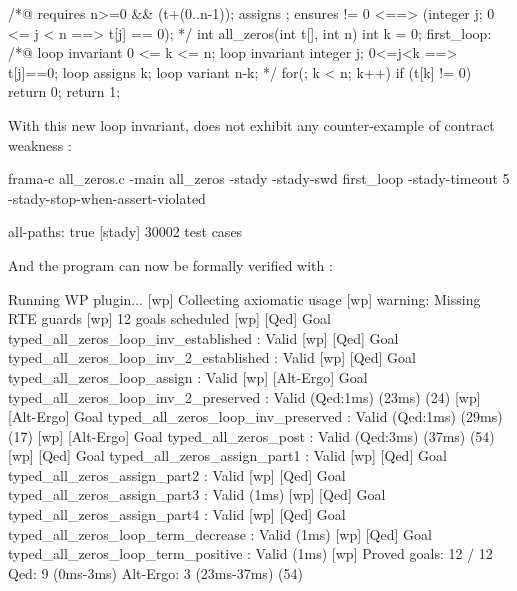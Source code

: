 \documentclass[web]{frama-c-book}
\begin{document}
\begin{ccode}
/*@ requires n>=0 && \valid(t+(0..n-1));
    assigns \nothing;
    ensures \result != 0 <==> 
      (\forall integer j; 0 <= j < n ==> t[j] == 0);
*/
int all_zeros(int t[], int n) {
  int k = 0;
 first_loop:
  /*@ loop invariant 0 <= k <= n;
      loop invariant \forall integer j; 0<=j<k ==> t[j]==0;
      loop assigns k;
      loop variant n-k; 
  */
  for(; k < n; k++) 
    if (t[k] != 0) 
      return 0;
  return 1;
}
\end{ccode}

With this new loop invariant, \stady does not exhibit any counter-example of contract weakness :

\begin{shell}
  frama-c all_zeros.c -main all_zeros -stady -stady-swd first_loop -stady-timeout 5
  -stady-stop-when-assert-violated
\end{shell}

\begin{shell}
[stady] all-paths: true
[stady] 30002 test cases
\end{shell}

And the program can now be formally verified with  :

\begin{shell}
[wp] Running WP plugin...
[wp] Collecting axiomatic usage
[wp] warning: Missing RTE guards
[wp] 12 goals scheduled
[wp] [Qed] Goal typed_all_zeros_loop_inv_established : Valid
[wp] [Qed] Goal typed_all_zeros_loop_inv_2_established : Valid
[wp] [Qed] Goal typed_all_zeros_loop_assign : Valid
[wp] [Alt-Ergo] Goal typed_all_zeros_loop_inv_2_preserved : Valid (Qed:1ms) (23ms) (24)
[wp] [Alt-Ergo] Goal typed_all_zeros_loop_inv_preserved : Valid (Qed:1ms) (29ms) (17)
[wp] [Alt-Ergo] Goal typed_all_zeros_post : Valid (Qed:3ms) (37ms) (54)
[wp] [Qed] Goal typed_all_zeros_assign_part1 : Valid
[wp] [Qed] Goal typed_all_zeros_assign_part2 : Valid
[wp] [Qed] Goal typed_all_zeros_assign_part3 : Valid (1ms)
[wp] [Qed] Goal typed_all_zeros_assign_part4 : Valid
[wp] [Qed] Goal typed_all_zeros_loop_term_decrease : Valid (1ms)
[wp] [Qed] Goal typed_all_zeros_loop_term_positive : Valid (1ms)
[wp] Proved goals:   12 / 12
     Qed:             9  (0ms-3ms)
     Alt-Ergo:        3  (23ms-37ms) (54)
\end{shell}




\appendix



\cleardoublepage
{}
{}




\cleardoublepage
{}
{}
\listoffigures


\cleardoublepage
{}
{}
\printindex
\end{document}
